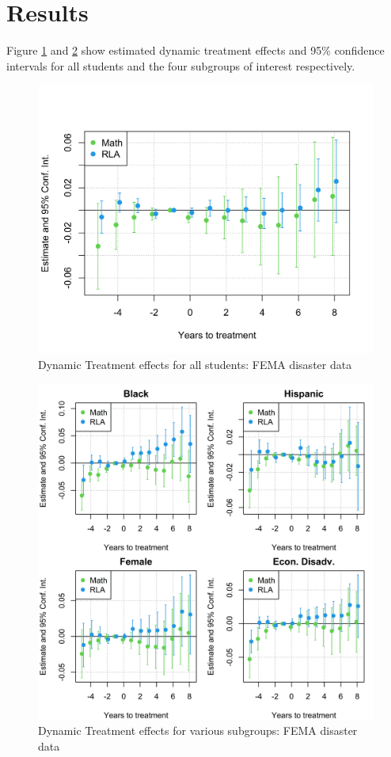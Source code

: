 \section{Results} \label{Results}

Figure \ref{ResultsPlot} and \ref{ResultsPlotSub} show estimated dynamic treatment effects and 95\% confidence intervals for all students and the four subgroups of interest respectively. 

\begin{figure}[!h]
	\centering
	\includegraphics[scale=1]{"../Code & Data/ResultsPlot.png"}
	\caption{Dynamic Treatment effects for all students: FEMA disaster data}
	\label{ResultsPlot}
\end{figure}

\begin{figure}[!h]
	\centering
	\includegraphics[scale=1]{"../Code & Data/ResultsPlotSub.png"}
	\caption{Dynamic Treatment effects for various subgroups: FEMA disaster data}
	\label{ResultsPlotSub}
\end{figure}


